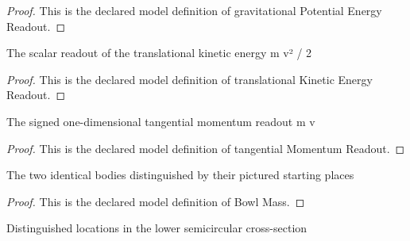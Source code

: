 \begin{proof}
  This is the declared model definition of gravitational Potential Energy Readout.
\end{proof}
\begin{definition}
  \label{def:physics:phyx-mini-0767:phyxminiproblems-problemphyxmini0767-translationalkineticenergyreadout}
  The scalar readout of the translational kinetic energy m v² / 2
\end{definition}
\begin{proof}
  This is the declared model definition of translational Kinetic Energy Readout.
\end{proof}
\begin{definition}
  \label{def:physics:phyx-mini-0767:phyxminiproblems-problemphyxmini0767-tangentialmomentumreadout}
  The signed one-dimensional tangential momentum readout m v
\end{definition}
\begin{proof}
  This is the declared model definition of tangential Momentum Readout.
\end{proof}
\begin{definition}
  \label{def:physics:phyx-mini-0767:phyxminiproblems-problemphyxmini0767-bowlmass}
  The two identical bodies distinguished by their pictured starting places
\end{definition}
\begin{proof}
  This is the declared model definition of Bowl Mass.
\end{proof}
\begin{definition}
  \label{def:physics:phyx-mini-0767:phyxminiproblems-problemphyxmini0767-bowllocation}
  Distinguished locations in the lower semicircular cross-section
\end{definition}
